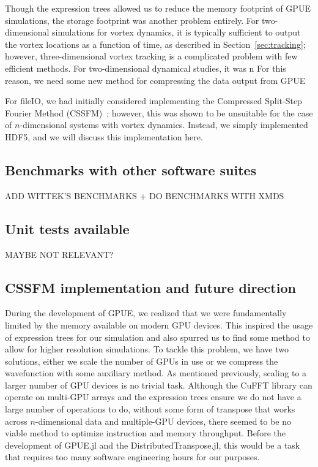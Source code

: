 Though the expression trees allowed us to reduce the memory footprint of GPUE simulations, the storage footprint was another problem entirely.
For two-dimensional simulations for vortex dynamics, it is typically sufficient to output the vortex locations as a function of time, as described in Section~\ref{sec:tracking}; however, three-dimensional vortex tracking is a complicated problem with few efficient methods.
For two-dimensional dynamical studies, it was n
For this reason, we need some new method for compressing the data output from GPUE

For fileIO, we had initially considered implementing the Compressed Split-Step Fourier Method (CSSFM)~\cite{bayindir2015}; however, this was shown to be unsuitable for the case of $n$-dimensional systems with vortex dynamics.
Instead, we simply implemented HDF5, and we will discuss this implementation here.

\subsection{Benchmarks with other software suites}

ADD WITTEK'S BENCHMARKS + DO BENCHMARKS WITH XMDS

\subsection{Unit tests available}

MAYBE NOT RELEVANT?

\subsection{CSSFM implementation and future direction}
\label{sec:multiGPU}

During the development of GPUE, we realized that we were fundamentally limited by the memory available on modern GPU devices.
This inspired the usage of expression trees for our simulation and also spurred us to find some method to allow for higher resolution simulations.
To tackle this problem, we have two solutions, either we scale the number of GPUs in use or we compress the wavefunction with some auxiliary method.
As mentioned previously, scaling to a larger number of GPU devices is no trivial task.
Although the CuFFT library can operate on multi-GPU arrays and the expression trees ensure we do not have a large number of operations to do, without some form of transpose that works across $n$-dimensional data and multiple-GPU devices, there seemed to be no viable method to optimize instruction and memory throughput.
Before the development of GPUE.jl and the DistributedTranspose.jl, this would be a task that requires too many software engineering hours for our purposes.

